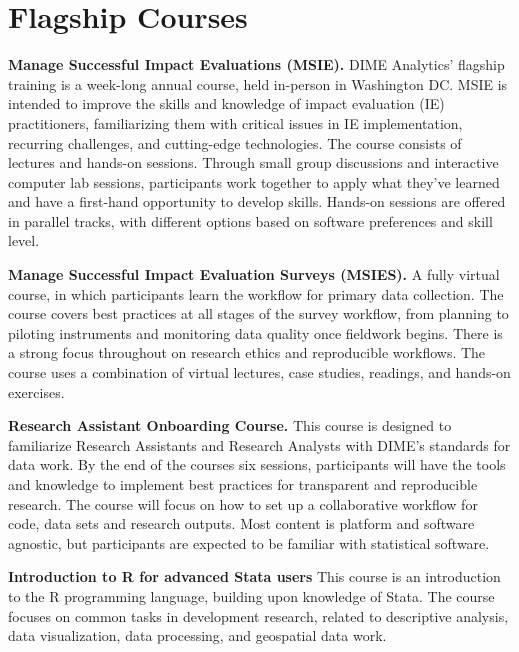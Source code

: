 \section{Flagship Courses}

\textbf{Manage Successful Impact Evaluations (MSIE).}
DIME Analytics’ flagship training is a week-long annual course, held in-person in Washington DC. MSIE is intended to improve the skills and knowledge of impact evaluation (IE) practitioners, familiarizing them with critical issues in IE implementation, recurring challenges, and cutting-edge technologies. The course consists of lectures and hands-on sessions. Through small group discussions and interactive computer lab sessions, participants work together to apply what they’ve learned and have a first-hand opportunity to develop skills. Hands-on sessions are offered in parallel tracks, with different options based on software preferences and skill level.

\resourcepar\textbf{Manage Successful Impact Evaluation Surveys (MSIES).}
A fully virtual course, in which participants learn the workflow for primary data collection. The course covers best practices at all stages of the survey workflow, from planning to piloting instruments and monitoring data quality once fieldwork begins. There is a strong focus throughout on research ethics and reproducible workflows. The course uses a combination of virtual lectures, case studies, readings, and hands-on exercises.

\resourcepar\textbf{Research Assistant Onboarding Course.}
This course is designed to familiarize Research Assistants and Research Analysts with DIME’s standards for data work. By the end of the courses six sessions, participants will have the tools and knowledge to implement best practices for transparent and reproducible research. The course will focus on how to set up a collaborative workflow for code, data sets and research outputs. Most content is platform and software agnostic, but participants are expected to be familiar with statistical software.

\resourcepar\textbf{Introduction to R for advanced Stata users}
This course is an introduction to the R programming language, building upon knowledge of Stata. The course focuses on common tasks in development research, related to descriptive analysis, data visualization, data processing, and geospatial data work. 

